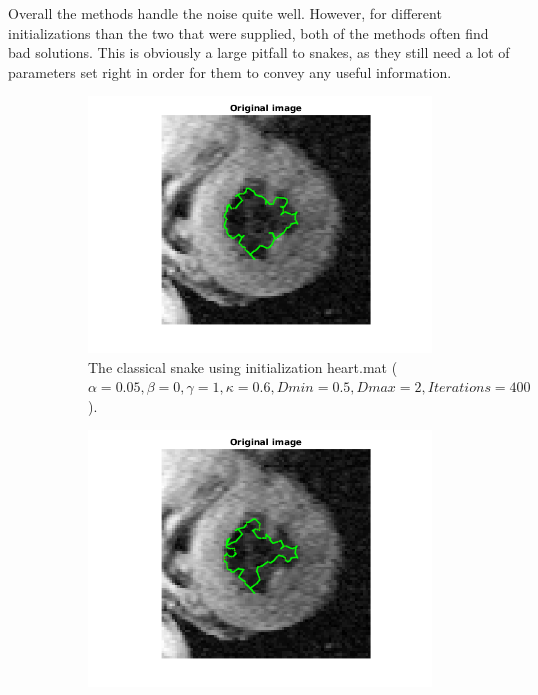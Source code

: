 \documentclass{article}
\begin{document}
Overall the methods handle the noise quite well. However, for different initializations than the two that were supplied, both of the methods often find bad solutions. This is obviously a large pitfall to snakes, as they still need a lot of parameters set right in order for them to convey any useful information.

\begin{figure}[h!]
\centering
\begin{subfigure}{0.49\textwidth}
  \centering
  \includegraphics[width=\linewidth]{fig6a.png}
  \caption{The classical snake using initialization heart.mat ($\alpha=0.05, \beta=0, \gamma=1,\kappa=0.6,Dmin=0.5,Dmax=2, Iterations=400$).}
  \label{fig6a}
\end{subfigure}
\begin{subfigure}{0.49\textwidth}
  \centering
  \includegraphics[width=\linewidth]{fig6b.png}

\end{subfigure}
\end{figure}
\end{document}
